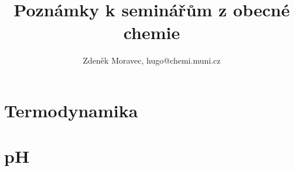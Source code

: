 \documentclass[12pt,a4paper,oneside]{book}
\begin{document}
	
\title{Poznámky k seminářům z obecné chemie}
\author{Zdeněk Moravec, hugo@chemi.muni.cz}

\maketitle
	
\tableofcontents
\clearpage

\let\clearpage\relax
\chapter{Termodynamika}

\newpage

\let\clearpage\relax
\chapter{pH}

\newpage
\end{document}
